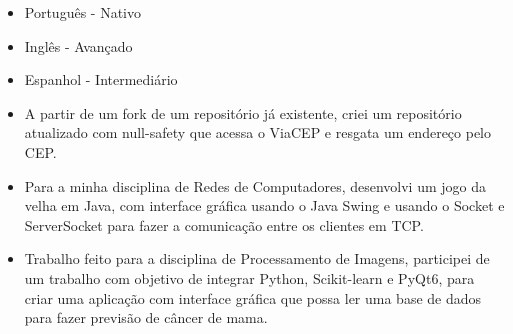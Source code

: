 \begin{itemize}
    \setlength\itemsep{1em}
    \item Português - Nativo 
    \item Inglês \hspace{16pt}- Avançado
    \item Espanhol \hspace{1pt} - Intermediário
\end{itemize}







\begin{itemize}
\item A partir de um fork de um repositório já existente, criei um repositório atualizado com null-safety que 
acessa o ViaCEP e resgata um endereço pelo CEP.
\end{itemize}
\smallskip
{}
\begin{itemize}
\item Para a minha disciplina de Redes de Computadores, desenvolvi um jogo da velha em Java, com interface 
gráfica usando o Java Swing e usando o Socket e ServerSocket para fazer a comunicação entre os clientes em TCP.
\end{itemize}
\smallskip
{}
\begin{itemize}
\item Trabalho feito para a disciplina de Processamento de Imagens, participei de um trabalho com objetivo
de integrar Python, Scikit-learn e PyQt6, para criar uma aplicação com interface gráfica que possa ler uma base de dados 
para fazer previsão de câncer de mama.
\end{itemize}
\smallskip

